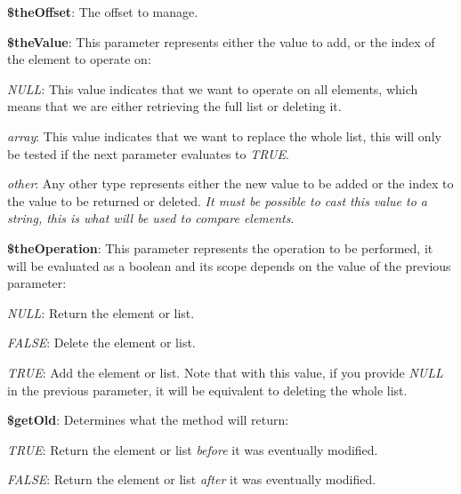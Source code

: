 \begin{DoxyItemize}
\item {\bfseries \$the\-Offset}\-: The offset to manage. 
\item {\bfseries \$the\-Value}\-: This parameter represents either the value to add, or the index of the element to operate on\-: 
\begin{DoxyItemize}
\item {\itshape N\-U\-L\-L\/}\-: This value indicates that we want to operate on all elements, which means that we are either retrieving the full list or deleting it. 
\item {\itshape array\/}\-: This value indicates that we want to replace the whole list, this will only be tested if the next parameter evaluates to {\itshape T\-R\-U\-E\/}. 
\item {\itshape other\/}\-: Any other type represents either the new value to be added or the index to the value to be returned or deleted. {\itshape It must be possible to cast this value to a string, this is what will be used to compare elements\/}. 
\end{DoxyItemize}
\item {\bfseries \$the\-Operation}\-: This parameter represents the operation to be performed, it will be evaluated as a boolean and its scope depends on the value of the previous parameter\-: 
\begin{DoxyItemize}
\item {\itshape N\-U\-L\-L\/}\-: Return the element or list. 
\item {\itshape F\-A\-L\-S\-E\/}\-: Delete the element or list. 
\item {\itshape T\-R\-U\-E\/}\-: Add the element or list. Note that with this value, if you provide {\itshape N\-U\-L\-L\/} in the previous parameter, it will be equivalent to deleting the whole list. 
\end{DoxyItemize}
\item {\bfseries \$get\-Old}\-: Determines what the method will return\-: 
\begin{DoxyItemize}
\item {\itshape T\-R\-U\-E\/}\-: Return the element or list {\itshape before\/} it was eventually modified. 
\item {\itshape F\-A\-L\-S\-E\/}\-: Return the element or list {\itshape after\/} it was eventually modified. 
\end{DoxyItemize}
\end{DoxyItemize}


